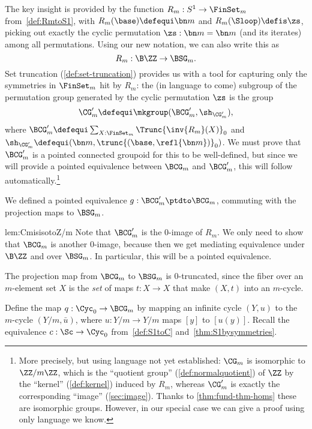\begin{example}
The key insight is provided by the function $R_m:S^1\to\FinSet_m$ from~\cref{def:RmtoS1},
with $R_m(\base)\defequi\bn m$ and
$R_m(\Sloop)\defis \zs$, picking out exactly the cyclic permutation
$\zs:\bn m=\bn m$ (and its iterates) among all permutations.
Using our new notation, we can also write this as
\[
  R_m : \B\ZZ \to \BSG_m.
\]
Set truncation (\cref{def:set-truncation}) provides us with a tool for capturing only the symmetries in $\FinSet_m$ hit by $R_m$:
the (in language to come) subgroup of the permutation group generated by the cyclic permutation $\zs$ is the group
\[
  \CG'_m\defequi\mkgroup(\BCG'_m,\sh_{\CG'_m}),
\]
where $\BCG'_m\defequi \sum_{X:\FinSet_m}\Trunc{\inv{R_m}(X)}_0$
and $\sh_{\CG'_m}\defequi (\bn m,\trunc{(\base,\refl{\bn m})}_0)$.
We must prove that $\BCG'_m$ is a pointed connected groupoid for
this to be well-defined, but since we will provide a pointed equivalence between $\BCG_m$ and $\BCG'_m$, this will follow automatically.\footnote{%
  More precisely, but using language not yet established: $\CG_m$ is isomorphic to $\ZZ/m\ZZ$, which is the ``quotient group'' (\cf \cref{def:normalquotient}) of $\ZZ$ by the ``kernel'' (\cf \cref{def:kernel}) induced by $R_m$, whereas $\CG'_m$ is exactly the corresponding ``image'' (\cf \cref{sec:image}). Thanks to \cref{thm:fund-thm-homs} these are isomorphic groups. However, in our special case we can give a proof using only language we know.}
\end{example}

\begin{construction}
  \label{lem:CmisisotoZ/m}
  We defined a pointed equivalence $g : \BCG'_m \ptdto \BCG_m$,
  commuting with the projection maps to $\BSG_m$.
\end{construction}

\begin{implementation}{lem:CmisisotoZ/m}
  Note that $\BCG'_m$ is the $0$-image of $R_m$.
  We only need to show that $\BCG_m$ is another $0$-image,
  because then we get mediating equivalence under $\B\ZZ$ and over $\BSG_m$.
  In particular, this will be a pointed equivalence.

  The projection map from $\BCG_m$ to $\BSG_m$ is $0$-truncated,
  since the fiber over an $m$-element set $X$ is the \emph{set}
  of maps $t : X \to X$ that make $(X,t)$ into an $m$-cycle.

  Define the map $q : \Cyc_0 \to \BCG_m$ by mapping an infinite cycle $(Y,u)$
  to the $m$-cycle $(Y/m,\bar u)$, where $u : Y/m \to Y/m$ maps $[y]$ to $[u(y)]$.
  Recall the equivalence $c : \Sc \to \Cyc_0$ from~\cref{def:S1toC}
  and~\cref{thm:S1bysymmetries}.
\end{implementation}

